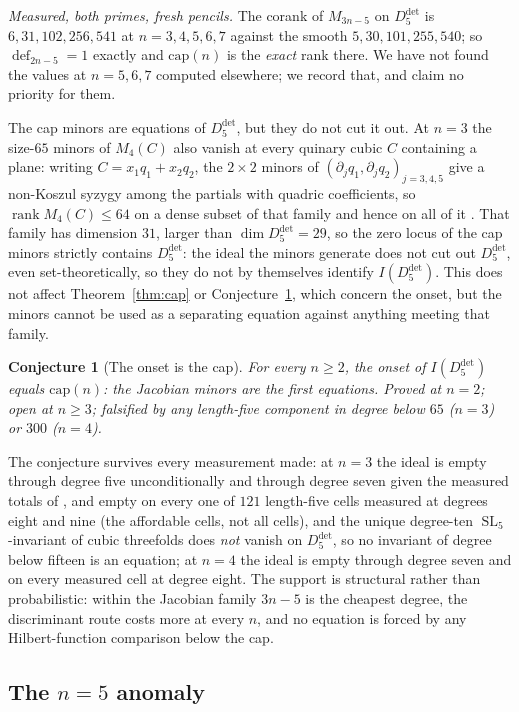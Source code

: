 \documentclass[11pt]{amsart}
\theoremstyle{plain}
\newtheorem{conjecture}[theorem]{Conjecture}
\theoremstyle{definition}
\theoremstyle{remark}
\DeclareMathOperator{\SL}{SL}
\DeclareMathOperator{\dfc}{def}
\DeclareMathOperator{\rank}{rank}
\newcommand{\Ddet}{D^{\det}}
\begin{document}
\emph{Measured, both primes, fresh pencils.} The corank of $M_{3n-5}$ on
$\Ddet_5$ is $6,31,102,256,541$ at $n=3,4,5,6,7$ against the smooth
$5,30,101,255,540$; so $\dfc_{2n-5}=1$ exactly and $\mathrm{cap}(n)$ is the
\emph{exact} rank there.  We have not found the values at $n=5,6,7$ computed
elsewhere; we record that, and claim no priority for them.

The cap minors are equations of $\Ddet_5$, but they do not cut it out.  At
$n=3$ the size-$65$ minors of $M_4(C)$ also vanish at every quinary cubic $C$
containing a plane: writing $C=x_1q_1+x_2q_2$, the $2\times2$ minors of
$(\partial_jq_1,\partial_jq_2)_{j=3,4,5}$ give a non-Koszul syzygy among the
partials with quadric coefficients, so $\rank M_4(C)\le64$ on a dense subset of
that family and hence on all of it \cite{Companion3}.  That family has dimension $31$, larger
than $\dim\Ddet_5=29$, so the zero locus of the cap minors strictly contains
$\Ddet_5$: the ideal the minors generate does not cut out $\Ddet_5$, even
set-theoretically, so they do not by themselves identify $I(\Ddet_5)$.  This
does not affect Theorem~\ref{thm:cap} or
Conjecture~\ref{conj:onset}, which concern the onset, but the minors cannot be
used as a separating equation against anything meeting that family.

\begin{conjecture}[The onset is the cap]\label{conj:onset}
For every $n\ge2$, the onset of $I(\Ddet_5)$ equals $\mathrm{cap}(n)$: the
Jacobian minors are the first equations.  Proved at $n=2$; open at $n\ge3$;
falsified by any length-five component in degree below $65$ ($n=3$) or $300$
($n=4$).
\end{conjecture}

The conjecture survives every measurement made: at $n=3$ the ideal is empty
through degree five unconditionally and through degree seven given the
measured totals of \cite{Companion}, and empty on every one of $121$
length-five cells measured at degrees eight and nine (the affordable cells, not
all cells), and the unique
degree-ten $\SL_5$-invariant of cubic threefolds does \emph{not} vanish on
$\Ddet_5$, so no invariant of degree below fifteen is an equation; at $n=4$ the
ideal is empty through degree seven and on every measured cell at degree eight.
The support is structural rather than probabilistic: within the Jacobian family
$3n-5$ is the cheapest degree, the discriminant route costs more at every $n$,
and no equation is forced by any Hilbert-function comparison below the cap.

\subsection{The $n=5$ anomaly}\label{sec:anomaly}
\end{document}
